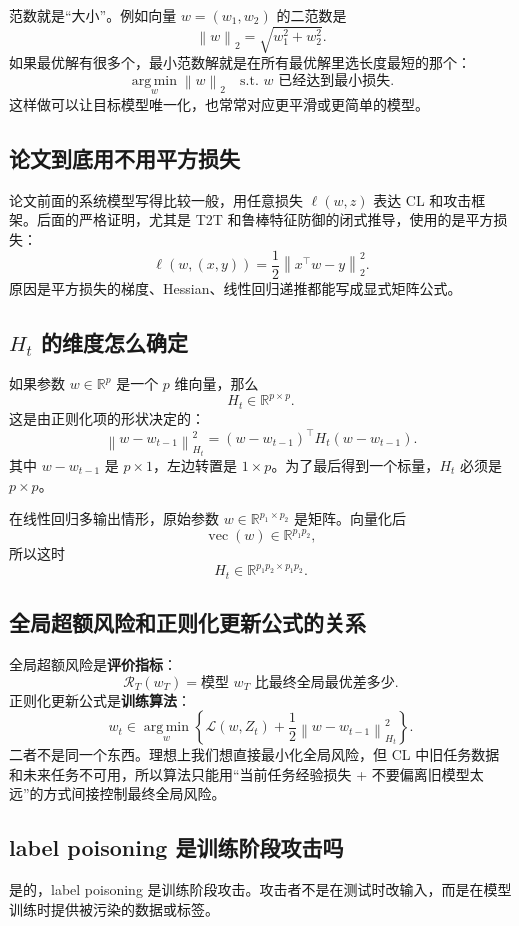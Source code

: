 \documentclass[UTF8,fontset=none,11pt]{ctexart}
\theoremstyle{cnstyle}
\newcommand{\R}{\mathbb{R}}
\newcommand{\vect}{\operatorname{vec}}
\newcommand{\argmin}{\operatorname*{arg\,min}}
\newcommand{\calR}{\mathcal{R}}
\newcommand{\calL}{\mathcal{L}}
\newcommand{\norm}[1]{\left\lVert #1\right\rVert}
\begin{document}
范数就是“大小”。例如向量 \(w=(w_1,w_2)\) 的二范数是
\[
  \norm{w}_2=\sqrt{w_1^2+w_2^2}.
\]
如果最优解有很多个，最小范数解就是在所有最优解里选长度最短的那个：
\[
  \argmin_w \norm{w}_2
  \quad
  \text{s.t. } w\text{ 已经达到最小损失}.
\]
这样做可以让目标模型唯一化，也常常对应更平滑或更简单的模型。

\subsection{论文到底用不用平方损失}

论文前面的系统模型写得比较一般，用任意损失 \(\ell(w,z)\) 表达 CL 和攻击框架。后面的严格证明，尤其是 T2T 和鲁棒特征防御的闭式推导，使用的是平方损失：
\[
  \ell(w,(x,y))=\frac12\norm{x^\top w-y}_2^2.
\]
原因是平方损失的梯度、Hessian、线性回归递推都能写成显式矩阵公式。

\subsection{\(H_t\) 的维度怎么确定}

如果参数 \(w\in\R^p\) 是一个 \(p\) 维向量，那么
\[
  H_t\in\R^{p\times p}.
\]
这是由正则化项的形状决定的：
\[
  \norm{w-w_{t-1}}_{H_t}^2
  =
  (w-w_{t-1})^\top H_t(w-w_{t-1}).
\]
其中 \(w-w_{t-1}\) 是 \(p\times1\)，左边转置是 \(1\times p\)。为了最后得到一个标量，\(H_t\) 必须是 \(p\times p\)。

在线性回归多输出情形，原始参数 \(w\in\R^{p_1\times p_2}\) 是矩阵。向量化后
\[
  \vect(w)\in\R^{p_1p_2},
\]
所以这时
\[
  H_t\in\R^{p_1p_2\times p_1p_2}.
\]

\subsection{全局超额风险和正则化更新公式的关系}

全局超额风险是\textbf{评价指标}：
\[
  \calR_T(w_T)
  =
  \text{模型 }w_T\text{ 比最终全局最优差多少}.
\]
正则化更新公式是\textbf{训练算法}：
\[
  w_t\in\argmin_w
  \left\{
  \calL(w,Z_t)+\frac12\norm{w-w_{t-1}}_{H_t}^2
  \right\}.
\]
二者不是同一个东西。理想上我们想直接最小化全局风险，但 CL 中旧任务数据和未来任务不可用，所以算法只能用“当前任务经验损失 + 不要偏离旧模型太远”的方式间接控制最终全局风险。

\subsection{label poisoning 是训练阶段攻击吗}

是的，label poisoning 是训练阶段攻击。攻击者不是在测试时改输入，而是在模型训练时提供被污染的数据或标签。
\end{document}
